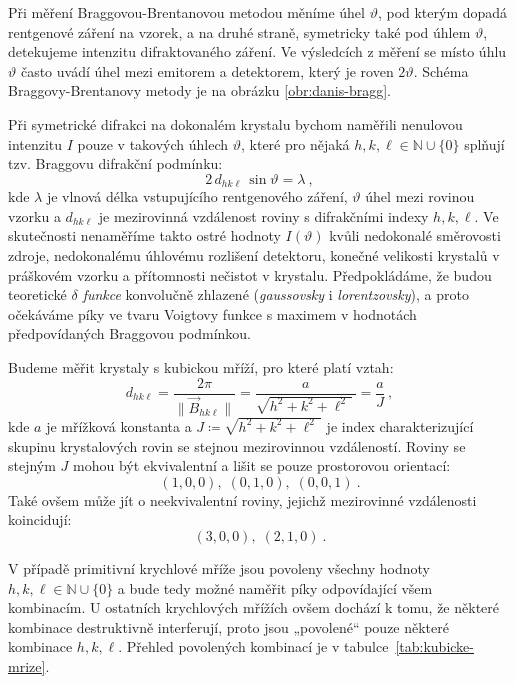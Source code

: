 \documentclass[10pt,a4paper]{article}
\newcommand{\°}{\degree}
\begin{document}
Při měření Braggovou-Brentanovou metodou měníme úhel $\vartheta$, pod kterým dopadá rentgenové záření na vzorek, a na druhé straně, symetricky také pod úhlem $\vartheta$, detekujeme intenzitu difraktovaného záření. Ve výsledcích z měření se místo úhlu $\vartheta$ často uvádí úhel mezi emitorem a detektorem, který je roven $2\vartheta$. Schéma Braggovy-Brentanovy metody je na obrázku \ref{obr:danis-bragg}.

Při symetrické difrakci na dokonalém krystalu bychom naměřili nenulovou intenzitu $I$ pouze v takových úhlech $\vartheta$, které pro nějaká $h,k,\ell \in \mathbb{N} \cup \{0\}$ splňují tzv. Braggovu difrakční podmínku:
\begin{equation}
    2 \, d_{hk\ell} \, \sin \vartheta = \lambda \: ,
    \label{eq:braggova-podminka}
\end{equation}
kde $\lambda$ je vlnová délka vstupujícího rentgenového záření, $\vartheta$ úhel mezi rovinou vzorku a $d_{hk\ell}$ je mezirovinná vzdálenost roviny s difrakčními indexy $h, k, \ell$. Ve skutečnosti nenaměříme takto ostré hodnoty $I(\vartheta)$ kvůli nedokonalé směrovosti zdroje, nedokonalému úhlovému rozlišení detektoru, konečné velikosti krystalů v práškovém vzorku a přítomnosti nečistot v krystalu. Předpokládáme, že budou teoretické \textit{$\delta$ funkce} konvolučně zhlazené (\textit{gaussovsky} i \textit{lorentzovsky}), a proto očekáváme píky ve tvaru Voigtovy funkce s maximem v hodnotách předpovídaných Braggovou podmínkou.

Budeme měřit krystaly s kubickou mříží, pro které platí vztah:
\begin{equation}
    d_{hk\ell}
    = \frac{2\pi}{\big\lVert \vec{B}_{hk\ell} \big\rVert}
    = \frac{a}{ \! \sqrt{h^2 + k^2 + \ell^2 \,} \, }
    = \frac{a}{J} \: ,
    \label{eq:mezirovinna-vzdalenost}
\end{equation}
kde $a$ je mřížková konstanta a $J \coloneqq \sqrt{h^2 + k^2 + \ell^2 \,}$ je index charakterizující skupinu krystalových rovin se stejnou mezirovinnou vzdáleností. Roviny se stejným $J$ mohou být ekvivalentní a lišit se pouze prostorovou orientací: $$(1,0,0), \; (0,1,0), \; (0,0,1) \: .$$ Také ovšem může jít o neekvivalentní roviny, jejichž mezirovinné vzdálenosti koincidují: $$(3,0,0), \; (2,1,0) \: .$$

V případě primitivní krychlové mříže jsou povoleny všechny hodnoty $h,k,\ell \in \mathbb{N} \cup \{0\}$ a bude tedy možné naměřit píky odpovídající všem kombinacím. U ostatních krychlových mřížích ovšem dochází k tomu, že některé kombinace destruktivně interferují, proto jsou „povolené“ pouze některé kombinace $h,k,\ell$. Přehled povolených kombinací je v tabulce~\ref{tab:kubicke-mrize}.
\end{document}
